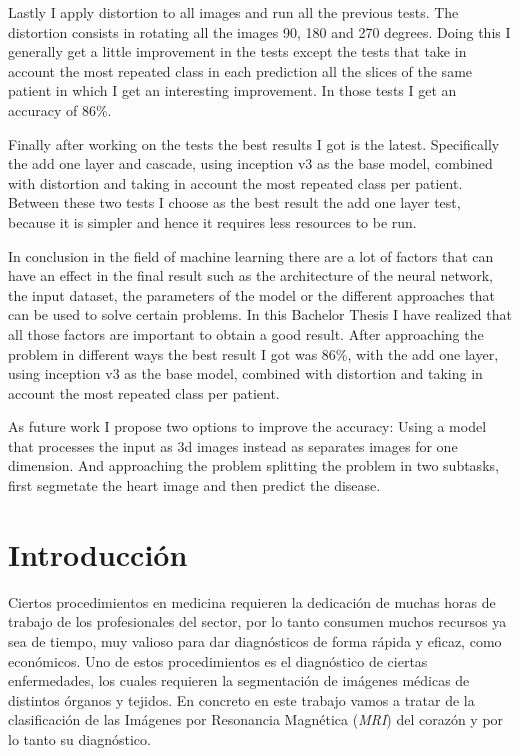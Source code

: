 \documentclass[12pt,a4paper]{article}
\begin{document}
Lastly I apply distortion to all images and run all the previous tests. The distortion consists in rotating all the images 90, 180 and 270 degrees. Doing this I generally get a little improvement in the tests except the tests that take in account the most repeated class in each prediction all the slices of the same patient in which I get an interesting improvement. In those tests I get an accuracy of 86\%.
\bigskip

Finally after working on the tests the best results I got is the latest. Specifically the add one layer and cascade, using inception v3 as the base model, combined with distortion and taking in account the most repeated class per patient. Between these two tests I choose as the best result the add one layer test, because it is simpler and hence it requires less resources to be run.
\bigskip

In conclusion in the field of machine learning there are a lot of factors that can have an effect in the final result such as the architecture of the neural network, the input dataset, the parameters of the model or the different approaches that can be used to solve certain problems. In this Bachelor Thesis I have realized that all those factors are important to obtain a good result. After approaching the problem in different ways the best result I got was 86\%, with the add one layer, using inception v3 as the base model, combined with distortion and taking in account the most repeated class per patient.
\bigskip

As future work I propose two options to improve the accuracy: Using a model that processes the input as 3d images instead as separates images for one dimension. And approaching the problem splitting the problem in two subtasks, first segmetate the heart image and then predict the disease.

\newpage
\section{Introducción}
\fancyhead[L]{\nouppercase{\rightmark}}

Ciertos procedimientos en medicina requieren la dedicación de muchas horas de trabajo de los profesionales del sector, por lo tanto consumen muchos recursos ya sea de tiempo, muy valioso para dar diagnósticos de forma rápida y eficaz, como económicos. Uno de estos procedimientos es el diagnóstico de ciertas enfermedades, los cuales requieren la segmentación de imágenes médicas de distintos órganos y tejidos. En concreto en este trabajo vamos a tratar de la clasificación de las Imágenes por Resonancia Magnética (\textit{MRI}) del corazón y por lo tanto su diagnóstico.
\bigskip
\end{document}

